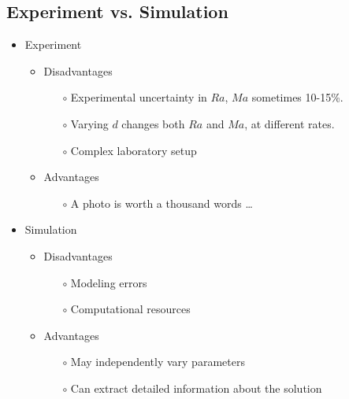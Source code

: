 \documentclass[compress,12pt]{beamer}
\begin{document}
\subsection{Experiment vs. Simulation}
\begin{frame}
  \begin{itemize}
    
  \item Experiment 
    \begin{itemize}
    \item Disadvantages
      \begin{itemize}
      \item[$\circ$] Experimental uncertainty in $Ra$, $Ma$ sometimes 10-15\%.
      \item[$\circ$] Varying $d$ changes both $Ra$ and $Ma$, at different rates.
      \item[$\circ$] Complex laboratory setup
      \end{itemize}

    \item Advantages
      \begin{itemize}
      \item[$\circ$] A photo is worth a thousand words \ldots
      \end{itemize}
    \end{itemize}
 
  \item Simulation
    \begin{itemize}
    \item Disadvantages
      \begin{itemize}
      \item[$\circ$] Modeling errors
      \item[$\circ$] Computational resources
      \end{itemize}
   
    \item Advantages
      \begin{itemize}
      \item[$\circ$] May independently vary parameters
      \item[$\circ$] Can extract detailed information about the solution
      \end{itemize} 
    \end{itemize}
  \end{itemize}
\end{frame}
\end{document}
